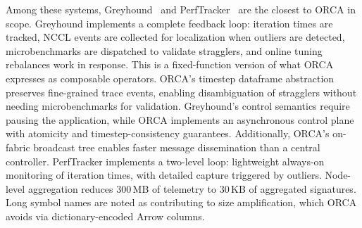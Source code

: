 Among these systems, Greyhound~\cite{Wu2025:GREYHOUND} and PerfTracker~\cite{Guan2025:PerfTracker}
are the closest to ORCA in scope.
Greyhound implements a complete feedback loop: iteration times are
tracked, NCCL events are collected for localization when outliers are
detected, microbenchmarks are dispatched to validate stragglers, and online
tuning rebalances work in response.
This is a fixed-function version of what ORCA expresses as composable operators.
ORCA's timestep dataframe abstraction preserves fine-grained trace events,
enabling disambiguation of stragglers without needing microbenchmarks for validation.
Greyhound's control semantics require pausing the application,
while ORCA implements an asynchronous control plane with atomicity and timestep-consistency
guarantees.
Additionally, ORCA's on-fabric broadcast tree enables faster message dissemination than a central
controller.
PerfTracker implements a two-level loop: lightweight always-on monitoring of iteration times, with
detailed capture triggered by outliers.
Node-level aggregation reduces 300\,MB of telemetry to 30\,KB of aggregated signatures.
Long symbol names are noted as contributing to size amplification, which ORCA avoids via
dictionary-encoded Arrow columns.